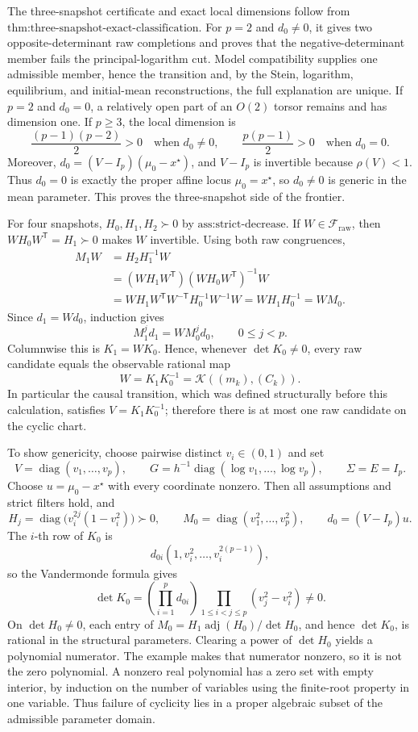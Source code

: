 The three-snapshot certificate and exact local dimensions follow from \(\text{thm:three-snapshot-exact-classification}\).  For \(p=2\) and \(d_0\ne0\), it gives two opposite-determinant raw completions and proves that the negative-determinant member fails the principal-logarithm cut.  Model compatibility supplies one admissible member, hence the transition and, by the Stein, logarithm, equilibrium, and initial-mean reconstructions, the full explanation are unique.  If \(p=2\) and \(d_0=0\), a relatively open part of an \(O(2)\) torsor remains and has dimension one.  If \(p\ge3\), the local dimension is
\[
 \frac{(p-1)(p-2)}2>0\quad\text{when }d_0\ne0,
 \qquad
 \frac{p(p-1)}2>0\quad\text{when }d_0=0.
\]
Moreover, \(d_0=(V-I_p)(\mu_0-x^\star)\), and \(V-I_p\) is invertible because \(\rho(V)<1\).  Thus \(d_0=0\) is exactly the proper affine locus \(\mu_0=x^\star\), so \(d_0\ne0\) is generic in the mean parameter.  This proves the three-snapshot side of the frontier.

For four snapshots, \(H_0,H_1,H_2\succ0\) by \(\text{ass:strict-decrease}\).  If \(W\in\mathcal F_{\mathrm{raw}}\), then \(WH_0W^{\mathsf T}=H_1\succ0\) makes \(W\) invertible.  Using both raw congruences,
\[
 \begin{aligned}
 M_1W
 &=H_2H_1^{-1}W\\
 &=(WH_1W^{\mathsf T})(WH_0W^{\mathsf T})^{-1}W\\
 &=WH_1W^{\mathsf T}W^{-\mathsf T}H_0^{-1}W^{-1}W
 =WH_1H_0^{-1}=WM_0.
 \end{aligned}
\]
Since \(d_1=Wd_0\), induction gives
\[
 M_1^jd_1=WM_0^jd_0,\qquad 0\leq j<p.
\]
Columnwise this is \(K_1=WK_0\).  Hence, whenever \(\det K_0\ne0\), every raw candidate equals the observable rational map
\[
 W=K_1K_0^{-1}=\mathcal K((m_k),(C_k)).
\]
In particular the causal transition, which was defined structurally before this calculation, satisfies \(V=K_1K_0^{-1}\); therefore there is at most one raw candidate on the cyclic chart.

To show genericity, choose pairwise distinct \(v_i\in(0,1)\) and set
\[
 V=\operatorname{diag}(v_1,\ldots,v_p),\qquad
 G=h^{-1}\operatorname{diag}(\log v_1,\ldots,\log v_p),
 \qquad \Sigma=E=I_p.
\]
Choose \(u=\mu_0-x^\star\) with every coordinate nonzero.  Then all assumptions and strict filters hold, and
\[
 H_j=\operatorname{diag}\bigl(v_i^{2j}(1-v_i^2)\bigr)\succ0,\qquad
 M_0=\operatorname{diag}(v_1^2,\ldots,v_p^2),\qquad
 d_0=(V-I_p)u.
\]
The \(i\)-th row of \(K_0\) is
\[
 d_{0i}(1,v_i^2,\ldots,v_i^{2(p-1)}),
\]
so the Vandermonde formula gives
\[
 \det K_0=\left(\prod_{i=1}^pd_{0i}\right)
 \prod_{1\leq i<j\leq p}(v_j^2-v_i^2)\ne0.
\]
On \(\det H_0\ne0\), each entry of \(M_0=H_1\operatorname{adj}(H_0)/\det H_0\), and hence \(\det K_0\), is rational in the structural parameters.  Clearing a power of \(\det H_0\) yields a polynomial numerator.  The example makes that numerator nonzero, so it is not the zero polynomial.  A nonzero real polynomial has a zero set with empty interior, by induction on the number of variables using the finite-root property in one variable.  Thus failure of cyclicity lies in a proper algebraic subset of the admissible parameter domain.

